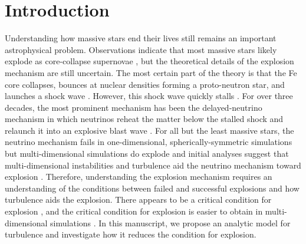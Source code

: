 \documentclass[twocolumn]{aastex6}
\begin{document}


\section{Introduction}
\label{sec:introduction}

Understanding how massive stars end their lives still remains an
important astrophysical problem.  Observations indicate that most massive stars
likely explode as core-collapse supernovae \citep{li11,horiuchi11}, but the theoretical
details of the explosion mechanism are still uncertain.  The most
certain part of the theory is that the Fe core collapses, bounces at
nuclear densities forming a proto-neutron star, and launches a
shock wave \citep{janka16}.  However, this shock wave quickly stalls \citep{hillebrandt81,mazurek82,mck82}.  For over three decades,
the most prominent mechanism has been the delayed-neutrino mechanism
in which neutrinos reheat the matter below the stalled shock and
relaunch it into an explosive blast wave \citep{bethe85}.  For
all but the least massive stars, the neutrino mechanism fails
in one-dimensional, spherically-symmetric simulations
\citep{liebendorfer01a,liebendorfer01b,liebendorfer05b,rampp02,buras03,thompson03,kitaura06,buras06b,radice17} but multi-dimensional simulations do explode 
\citep{herant94,janka95,burrows95,janka96,burrows07b,melson15,dolence15,muller16,roberts16,bruenn16} and initial
analyses suggest that multi-dimensional instabilities and turbulence
aid the neutrino mechanism toward explosion \citep{murphy08b,marek09b,murphy11,hanke12,murphy13,radice16,couch15,melson15}.  Therefore, understanding
the explosion mechanism requires an understanding of the conditions
between failed and successful explosions and how turbulence aids the
explosion.  There appears to be a critical condition for explosion \citep{burrows93,murphy08b,murphy17},
and the critical condition for explosion is easier to obtain in multi-dimensional
simulations \citep{herant94,janka95,janka96,burrows95,murphy08b,melson15}.  In this manuscript, we propose an analytic model for turbulence and investigate how it reduces the condition for explosion. 
\end{document}
